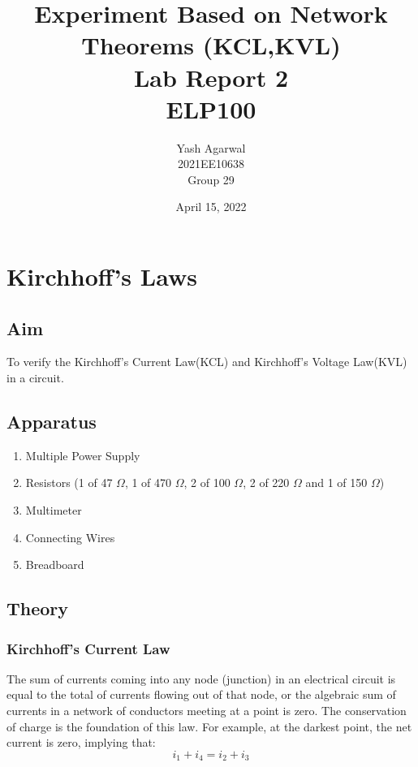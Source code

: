 \documentclass{article}
\title{Experiment Based on Network Theorems (KCL,KVL) \\ Lab Report 2 \\ ELP100}
\author{Yash Agarwal \\ 2021EE10638 \\ Group 29}
\date{April 15, 2022}
\begin{document}
\pagecolor{yellow!15}
\maketitle
\vspace{20px}
\tableofcontents
{}
\newpage
\section{Kirchhoff's Laws}
\vfill
\subsection{Aim}
To verify the Kirchhoff's Current Law(KCL) and Kirchhoff's Voltage Law(KVL) in a circuit.
\vfill
\subsection{Apparatus}
\begin{enumerate}
    \item Multiple Power Supply
    \item Resistors (1 of 47 $\Omega$, 1 of 470 $\Omega$, 2 of 100 $\Omega$, 2 of 220 $\Omega$ and 1 of 150 $\Omega$)
    \item Multimeter
    \item Connecting Wires
    \item Breadboard
\end{enumerate}
\vfill
\subsection{Theory}
\vfill
\subsubsection{Kirchhoff's Current Law}

\begin{figure}
\end{figure}

The sum of currents coming into any node (junction) in an electrical circuit is equal to the total of currents flowing out of that node, or the algebraic sum of currents in a network of conductors meeting at a point is zero.
The conservation of charge is the foundation of this law. For example, at the darkest point, the net current is zero, implying that:
\[i_1+i_4=i_2+i_3\]
\end{document}

